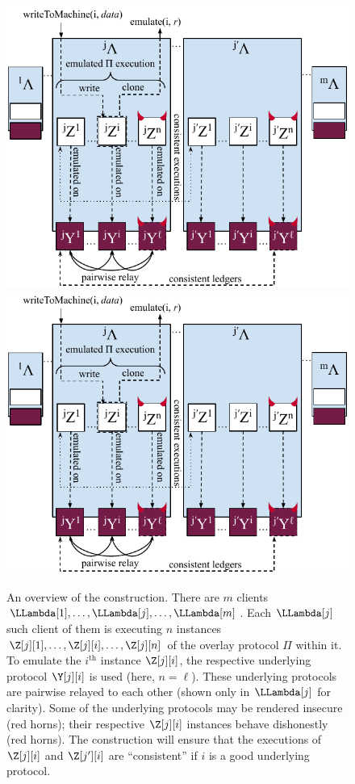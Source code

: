 \begin{figure}
    \centering
    \iftwocolumn
    \includegraphics[width=\columnwidth,keepaspectratio]{figures/rollerblade-overview.pdf}
    \else
    \includegraphics[width=0.9 \columnwidth,keepaspectratio]{figures/rollerblade-overview.pdf}
    \fi
    \caption{An overview of the \rollerblade construction.
             There are $m$ \rollerblade clients $\LLambda[1], \ldots, \LLambda[j], \ldots, \LLambda[m]$.
             Each $\LLambda[j]$ such client of them is executing $n$ instances $\Z[j][1], \ldots, \Z[j][i], \ldots, \Z[j][n]$
             of the overlay protocol $\Pi$ within it.
             To emulate the $i^\text{th}$ instance $\Z[j][i]$, the respective
             underlying protocol $\Y[j][i]$ is used (here, $n = \ell$).
             These underlying protocols are pairwise relayed to each other
             (shown only in $\LLambda[j]$ for clarity).
             Some of the underlying
             protocols may be rendered insecure (red horns); their respective
             $\Z[j][i]$ instances behave dishonestly (red horns).
             The construction will ensure that the executions of $\Z[j][i]$ and
             $\Z[j'][i]$ are ``consistent'' if $i$ is a good underlying protocol.}
    \label{fig.rollerblade-overview}
\end{figure}

